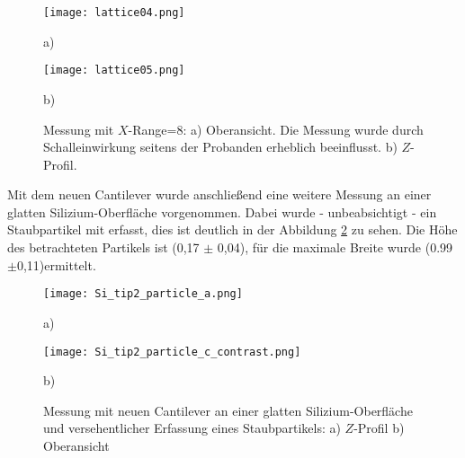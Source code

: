 \begin{figure}[H]
\centering
\begin{minipage}{0.45\textwidth}
\centering
		\texttt{[image: lattice04.png]}
		\caption*{a)}
	\end{minipage}
	\hfill
\begin{minipage}{0.45\textwidth}
\centering
		\texttt{[image: lattice05.png]}
		\caption*{b)}
	\end{minipage}
	\caption[Messung mit $X$-Range=8\micro\metre]{Messung mit $X$-Range=8\micro\metre: a) Oberansicht. Die Messung wurde durch Schalleinwirkung seitens der Probanden erheblich beeinflusst. b) $Z$-Profil.}
	\label{fig:Lattice2}
\end{figure}

Mit dem neuen Cantilever wurde anschließend eine weitere Messung an einer glatten Silizium-Oberfläche vorgenommen. Dabei wurde - unbeabsichtigt - ein Staubpartikel mit erfasst, dies ist deutlich in der Abbildung \ref{fig:Si_particle} zu sehen. Die Höhe des betrachteten Partikels ist (0,17 $\pm$ 0,04)\micro\metre, für die maximale Breite wurde (0.99$\pm$0,11)\micro\metre ermittelt.
\begin{figure}[H]
\centering
	\begin{minipage}{0.45\textwidth}
	\centering
		\texttt{[image: Si\_tip2\_particle\_a.png]}
		\caption*{a)}
	\end{minipage}
	\hfill
	\begin{minipage}{0.45\textwidth}
	\centering
		\texttt{[image: Si\_tip2\_particle\_c\_contrast.png]}
	\caption*{b)}
	\end{minipage}
	\caption[Messung mit Staubpartikel]{Messung mit neuen Cantilever an einer glatten Silizium-Oberfläche und versehentlicher Erfassung eines Staubpartikels: a) $Z$-Profil b) Oberansicht}
	\label{fig:Si_particle}
\end{figure}


